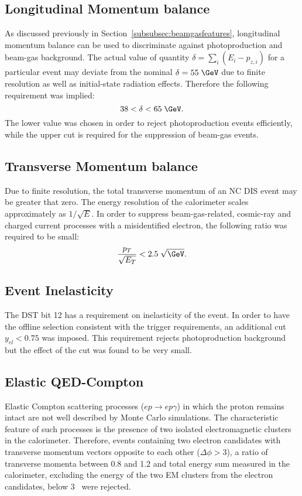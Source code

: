 \subsection{Longitudinal Momentum balance}
\label{subsec:empzcut}
As discussed previously in Section~\ref{subsubsec:beamgasfeatures}, longitudinal momentum balance can be used to discriminate against photoproduction and beam-gas background. The actual value of quantity $\delta=\sum_i{\left(E_i-p_{z,i}\right)}$ for a particular event may deviate from the nominal $\delta=55\;\GeV$ due to finite resolution as well as initial-state radiation effects. Therefore the following requirement was implied:
\begin{equation}
38 < \delta < 65\;\GeV.
\label{eq:epmzcut}
\end{equation}
The lower value was chosen in order to reject photoproduction events efficiently, while the upper cut is required for the suppression of beam-gas events.

\subsection{Transverse Momentum balance}
\label{subsec:empzcut}
Due to finite resolution, the total transverse momentum of an NC DIS event may be greater that zero. The energy resolution of the calorimeter scales approximately as $1/\sqrt{E}$. In order to suppress beam-gas-related, cosmic-ray and charged current processes with a misidentified electron, the following ratio was required to be small:
\begin{equation}
\frac{p_T}{\sqrt{E_T}} < 2.5\;\sqrt{\GeV}.
\label{eq:ptcut}
\end{equation}

\subsection{Event Inelasticity}
\label{subsec:yelcut}

The DST bit 12 has a requirement on inelasticity of the event. In order to have the offline selection consistent with the trigger requirements, an additional cut $y_{el} < 0.75$ was imposed. This requirement rejects photoproduction background but the effect of the cut was found to be very small.

\subsection{Elastic QED-Compton}
\label{subsec:elasticqedcut}
Elastic Compton scattering processes ($ep \rightarrow ep\gamma$) in which the proton remains intact are not well described by Monte Carlo simulations. The characteristic feature of such processes is the presence of two isolated electromagnetic clusters in the calorimeter. Therefore, events containing two electron candidates with transverse momentum vectors opposite to each other ($\Delta\phi > 3$), a ratio of transverse momenta between 0.8 and 1.2 and total energy sum measured in the calorimeter, excluding the energy of the two EM clusters from the electron candidates, below 3 \GeV~were rejected.

